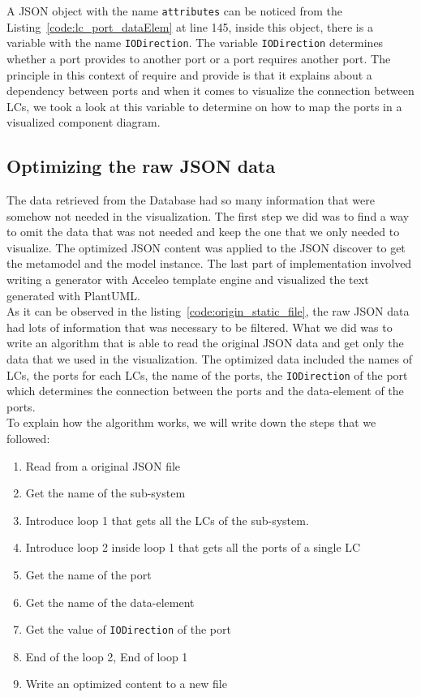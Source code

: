 A JSON object with the name \texttt{attributes} can be noticed from the Listing~\ref{code:lc_port_dataElem} at line 145, inside this object, there is a variable with the name \texttt{IODirection}. The variable \texttt{IODirection} determines whether a port provides to another port or a port requires another port. The principle in this context of require and provide is that it explains about a dependency between ports and when it comes to visualize the connection between LCs, we took a look at this variable to determine on how to map the ports in a visualized component diagram.

\subsection{Optimizing the raw JSON data}
The data retrieved from the Database had so many information that were somehow not needed in the visualization. The first step we did was to find a way to omit the data that was not needed and keep the one that we only needed to visualize. The optimized JSON content was applied to the JSON discover to get the metamodel and the model instance. The last part of implementation involved writing a generator with Acceleo template engine and visualized the text generated with PlantUML.\\

As it can be observed in the listing~\ref{code:origin_static_file}, the raw JSON data had lots of information that was necessary to be filtered. What we did was to write an algorithm that is able to read the original JSON data and get only the data that we used in the visualization. The optimized data included the names of LCs, the ports for each LCs, the name of the ports, the \texttt{IODirection} of the port which determines the connection between the ports and the data-element of the ports.\\

To explain how the algorithm works, we will write down the steps that we followed:
\begin{enumerate}
\item Read from a original JSON file
\item Get the name of the sub-system
\item Introduce loop 1 that gets all the LCs of the sub-system.
\item Introduce loop 2 inside loop 1 that gets all the ports of a single LC
\item Get the name of the port
\item Get the name of the data-element
\item Get the value of \texttt{IODirection} of the port
\item End of the loop 2, End of loop 1
\item Write an optimized content to a new file
\end{enumerate}

